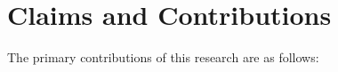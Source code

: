 


\section{Claims and Contributions}

The primary contributions of this research are as follows:
  
